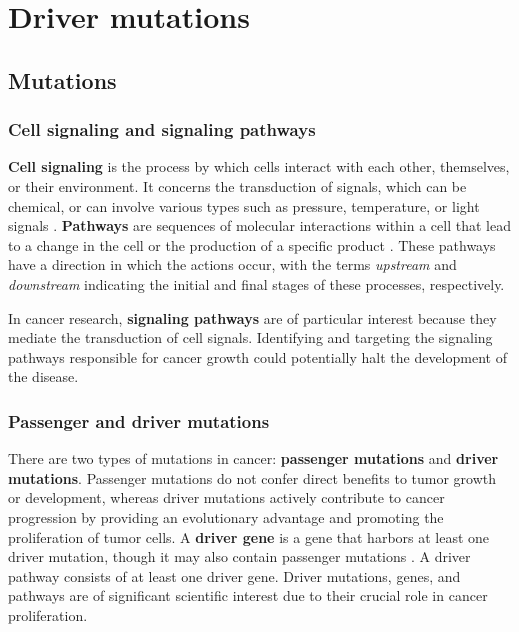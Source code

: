 \chapter{Driver mutations} \label{chap:driver_mutations}

\section{Mutations}

\subsection{Cell signaling and signaling pathways}

\textbf{Cell signaling} is the process by which cells interact with each other, themselves, or their environment. It concerns the transduction of signals, which can be chemical, or can involve various types such as pressure, temperature, or light signals \cite{cell_signaling}. \textbf{Pathways} are sequences of molecular interactions within a cell that lead to a change in the cell or the production of a specific product \cite{pathway}. These pathways have a direction in which the actions occur, with the terms \textit{upstream} and \textit{downstream} indicating the initial and final stages of these processes, respectively.

In cancer research, \textbf{signaling pathways} are of particular interest because they mediate the transduction of cell signals. Identifying and targeting the signaling pathways responsible for cancer growth could potentially halt the development of the disease. 

\subsection{Passenger and driver mutations}

There are two types of mutations in cancer: \textbf{passenger mutations} and \textbf{driver mutations}. Passenger mutations do not confer direct benefits to tumor growth or development, whereas driver mutations actively contribute to cancer progression by providing an evolutionary advantage and promoting the proliferation of tumor cells. A \textbf{driver gene} is a gene that harbors at least one driver mutation, though it may also contain passenger mutations . A driver pathway consists of at least one driver gene. Driver mutations, genes, and pathways are of significant scientific interest due to their crucial role in cancer proliferation.

